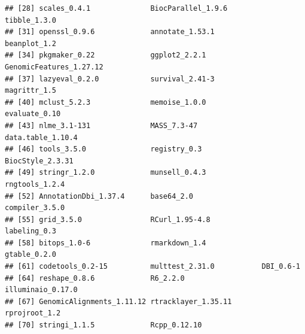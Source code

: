 \documentclass{article}\usepackage[]{graphicx}\usepackage[usenames,dvipsnames]{color}
\makeatletter
\newenvironment{kframe}{%
 \def\at@end@of@kframe{}%
 \ifinner\ifhmode%
  \def\at@end@of@kframe{\end{minipage}}%
  \begin{minipage}{\columnwidth}%
 \fi\fi%
 \def\FrameCommand##1{\hskip\@totalleftmargin \hskip-\fboxsep
 \colorbox{shadecolor}{##1}\hskip-\fboxsep
     \hskip-\linewidth \hskip-\@totalleftmargin \hskip\columnwidth}%
 \MakeFramed {\advance\hsize-\width
   \@totalleftmargin\z@ \linewidth\hsize
   \@setminipage}}%
 {\par\unskip\endMakeFramed%
 \at@end@of@kframe}
\newenvironment{knitrout}{}{} %
\makeatother
\begin{document}
\begin{knitrout}
\begin{kframe}
\begin{verbatim}
## [28] scales_0.4.1              BiocParallel_1.9.6        tibble_1.3.0             
## [31] openssl_0.9.6             annotate_1.53.1           beanplot_1.2             
## [34] pkgmaker_0.22             ggplot2_2.2.1             GenomicFeatures_1.27.12  
## [37] lazyeval_0.2.0            survival_2.41-3           magrittr_1.5             
## [40] mclust_5.2.3              memoise_1.0.0             evaluate_0.10            
## [43] nlme_3.1-131              MASS_7.3-47               data.table_1.10.4        
## [46] tools_3.5.0               registry_0.3              BiocStyle_2.3.31         
## [49] stringr_1.2.0             munsell_0.4.3             rngtools_1.2.4           
## [52] AnnotationDbi_1.37.4      base64_2.0                compiler_3.5.0           
## [55] grid_3.5.0                RCurl_1.95-4.8            labeling_0.3             
## [58] bitops_1.0-6              rmarkdown_1.4             gtable_0.2.0             
## [61] codetools_0.2-15          multtest_2.31.0           DBI_0.6-1                
## [64] reshape_0.8.6             R6_2.2.0                  illuminaio_0.17.0        
## [67] GenomicAlignments_1.11.12 rtracklayer_1.35.11       rprojroot_1.2            
## [70] stringi_1.1.5             Rcpp_0.12.10
\end{verbatim}
\end{kframe}
\end{knitrout}



\end{document}
